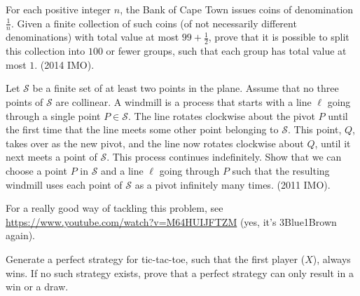 \documentclass[11pt]{article}
\begin{document}
\begin{problem}[45]
    For each positive integer $n$, the Bank of Cape Town issues coins of denomination $\tfrac{1}{n}$. Given a finite collection of such coins (of not necessarily different denominations) with total value at most $99+\tfrac{1}{2}$, prove that it is possible to split this collection into $100$ or fewer groups, such that each group has total value at most $1$. (2014 IMO).
\end{problem}
\begin{problem}[45]
    Let $\mathcal{S}$ be a finite set of at least two points in the plane. Assume that no three points of $\mathcal S$ are collinear. A windmill is a process that starts with a line $\ell$ going through a single point $P \in \mathcal S$. The line rotates clockwise about the pivot $P$ until the first time that the line meets some other point belonging to $\mathcal S$. This point, $Q$, takes over as the new pivot, and the line now rotates clockwise about $Q$, until it next meets a point of $\mathcal S$. This process continues indefinitely. Show that we can choose a point $P$ in $\mathcal S$ and a line $\ell$ going through $P$ such that the resulting windmill uses each point of $\mathcal S$ as a pivot infinitely many times. (2011 IMO).
    \begin{remark}
        For a really good way of tackling this problem, see \url{https://www.youtube.com/watch?v=M64HUIJFTZM} (yes, it's 3Blue1Brown again).
    \end{remark}
\end{problem}
\begin{problem}[HM45]
    Generate a perfect strategy for tic-tac-toe, such that the first player ($X$), always wins. If no such strategy exists, prove that a perfect strategy can only result in a win or a draw.
\end{problem}
\end{document}

